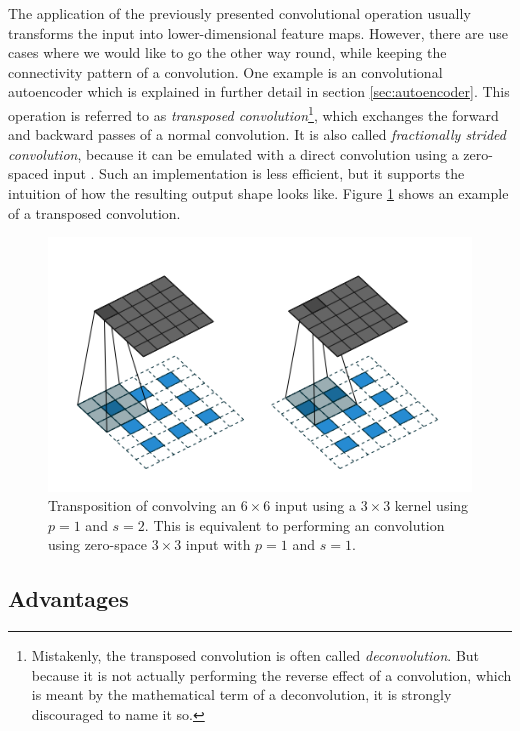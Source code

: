 The application of the previously presented convolutional operation usually transforms the input into lower-dimensional feature maps. However, there are use cases where we would like to go the other way round, while keeping the connectivity pattern of a convolution. One example is an convolutional autoencoder which is explained in further detail in section \ref{sec:autoencoder}. This operation is referred to as \textit{transposed convolution}\footnote{Mistakenly, the transposed convolution is often called \textit{deconvolution}. But because it is not actually performing the reverse effect of a convolution, which is meant by the mathematical term of a deconvolution, it is strongly discouraged to name it so.}, which exchanges the forward and backward passes of a normal convolution. It is also called \textit{fractionally strided convolution}, because it can be emulated with a direct convolution using a zero-spaced input \cite[p. 19]{conv_guide}. Such an implementation is less efficient, but it supports the intuition of how the resulting output shape looks like. Figure \ref{fig:conv_tp} shows an example of a transposed convolution.

\begin{figure}[htpb]
	\centering
	\includegraphics[scale=0.4]{figures/conv_tp.png}
	\caption[Transposed convolution operation]{Transposition of convolving an $6 \times 6$ input using a $3 \times 3$ kernel using $p=1$ and $s=2$. This is equivalent to performing an convolution using zero-space $3 \times 3$ input with $p=1$ and $s=1$.} \label{fig:conv_tp}
\end{figure}


\subsection{Advantages}

